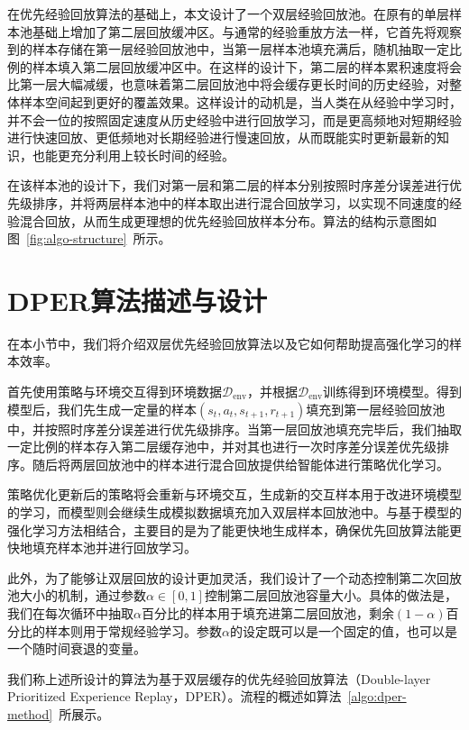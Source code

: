 在优先经验回放算法的基础上，本文设计了一个双层经验回放池。在原有的单层样本池基础上增加了第二层回放缓冲区。与通常的经验重放方法一样，它首先将观察到的样本存储在第一层经验回放池中，当第一层样本池填充满后，随机抽取一定比例的样本填入第二层回放缓冲区中。在这样的设计下，第二层的样本累积速度将会比第一层大幅减缓，也意味着第二层回放池中将会缓存更长时间的历史经验，对整体样本空间起到更好的覆盖效果。这样设计的动机是，当人类在从经验中学习时，并不会一位的按照固定速度从历史经验中进行回放学习，而是更高频地对短期经验进行快速回放、更低频地对长期经验进行慢速回放，从而既能实时更新最新的知识，也能更充分利用上较长时间的经验。

在该样本池的设计下，我们对第一层和第二层的样本分别按照时序差分误差进行优先级排序，并将两层样本池中的样本取出进行混合回放学习，以实现不同速度的经验混合回放，从而生成更理想的优先经验回放样本分布。算法的结构示意图如图~\ref{fig:algo-structure}~所示。


\section{DPER算法描述与设计}

在本小节中，我们将介绍双层优先经验回放算法以及它如何帮助提高强化学习的样本效率。

首先使用策略与环境交互得到环境数据$\mathcal{D}_{\text{env}}$，并根据$\mathcal{D}_{\text{env}}$训练得到环境模型。得到模型后，我们先生成一定量的样本$(s_t, a_t, s_{t+1}, r_{t+1})$填充到第一层经验回放池中，并按照时序差分误差进行优先级排序。当第一层回放池填充完毕后，我们抽取一定比例的样本存入第二层缓存池中，并对其也进行一次时序差分误差优先级排序。随后将两层回放池中的样本进行混合回放提供给智能体进行策略优化学习。

策略优化更新后的策略将会重新与环境交互，生成新的交互样本用于改进环境模型的学习，而模型则会继续生成模拟数据填充加入双层样本回放池中。与基于模型的强化学习方法相结合，主要目的是为了能更快地生成样本，确保优先回放算法能更快地填充样本池并进行回放学习。

此外，为了能够让双层回放的设计更加灵活，我们设计了一个动态控制第二次回放池大小的机制，通过参数$\alpha\in[0,1]$控制第二层回放池容量大小。具体的做法是，我们在每次循环中抽取$\alpha$百分比的样本用于填充进第二层回放池，剩余$(1-\alpha)$百分比的样本则用于常规经验学习。参数$\alpha$的设定既可以是一个固定的值，也可以是一个随时间衰退的变量。

我们称上述所设计的算法为基于双层缓存的优先经验回放算法（Double-layer Prioritized Experience Replay，DPER）。流程的概述如算法~\ref{algo:dper-method}~所展示。

